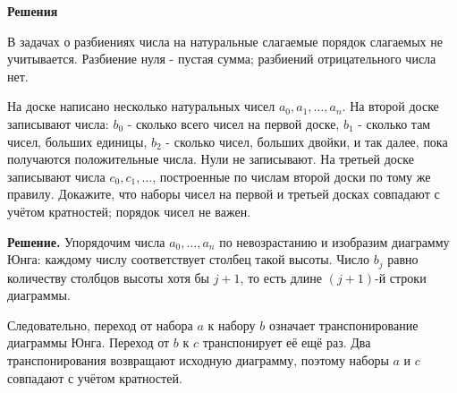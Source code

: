 

\ifPDFTeX
  \renewcommand{\rmdefault}{cmr}
\fi

\def\SheetNo{6}
\setlength{\emergencystretch}{2em}



\begin{center}\textbf{Решения}\end{center}

\noindent В задачах о разбиениях числа на натуральные слагаемые порядок слагаемых не учитывается. Разбиение нуля - пустая сумма; разбиений отрицательного числа нет.

\begin{problems}

\item На доске написано несколько натуральных чисел $a_0,a_1,\ldots,a_n$. На второй доске записывают числа: $b_0$ - сколько всего чисел на первой доске, $b_1$ - сколько там чисел, больших единицы, $b_2$ - сколько чисел, больших двойки, и так далее, пока получаются положительные числа. Нули не записывают. На третьей доске записывают числа $c_0,c_1,\ldots$, построенные по числам второй доски по тому же правилу. Докажите, что наборы чисел на первой и третьей досках совпадают с учётом кратностей; порядок чисел не важен.
\par\smallskip\noindent\textbf{Решение.} Упорядочим числа $a_0,\ldots,a_n$ по невозрастанию и изобразим диаграмму Юнга: каждому числу соответствует столбец такой высоты. Число $b_j$ равно количеству столбцов высоты хотя бы $j+1$, то есть длине $(j+1)$-й строки диаграммы.
\par Следовательно, переход от набора $a$ к набору $b$ означает транспонирование диаграммы Юнга. Переход от $b$ к $c$ транспонирует её ещё раз. Два транспонирования возвращают исходную диаграмму, поэтому наборы $a$ и $c$ совпадают с учётом кратностей.\par


\end{problems}
